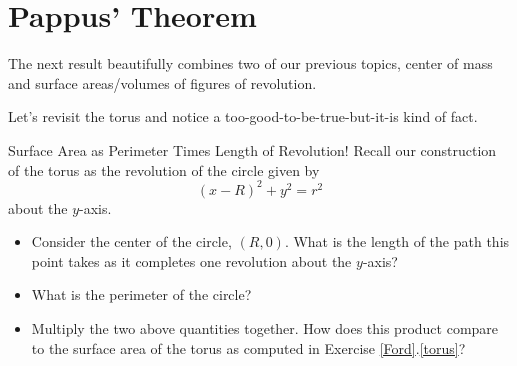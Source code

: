 
\section{Pappus' Theorem}

The next result beautifully combines two of our previous topics, center of mass and surface areas/volumes of figures of revolution.  

Let's revisit the torus and notice a too-good-to-be-true-but-it-is kind of fact.  

\begin{exercise}{Surface Area as Perimeter Times Length of Revolution! \Coffeecup}
Recall our construction of the torus as the revolution of the circle given by $$(x-R)^2+y^2=r^2 $$ about the $y$-axis. 

\begin{itemize}
\item Consider the center of the circle, $(R,0)$.  What is the length of the path this point takes as it completes one revolution about the $y$-axis?

\vspace*{1in}

\item What is the perimeter of the circle?

\vspace*{1in}

\item Multiply the two above quantities together.  How does this product compare to the surface area of the torus as computed in Exercise \ref{Ford}.\ref{torus}? 

\end{itemize}
\end{exercise}